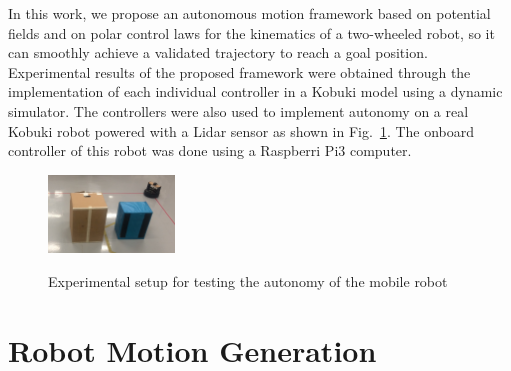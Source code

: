 \documentclass[conference]{IEEEtran}
\begin{document}
In this work, we propose an autonomous motion framework based on potential fields and on polar control laws for the kinematics of a two-wheeled robot, so it can smoothly achieve a validated trajectory to reach a goal position. Experimental results of the proposed framework were obtained through the implementation of each individual controller in a Kobuki model using a dynamic simulator. The controllers were also used to implement autonomy on a real Kobuki robot powered with a Lidar sensor as shown in Fig.~\ref{fig:example-robot}.  The onboard controller of this robot was done using a Raspberri Pi3 computer.

\begin{figure}%
  \centering \footnotesize
  \subfloat
  {\includegraphics[width=0.3\textwidth]{kobuki}}
  \captionsetup{font=footnotesize}
  \caption{Experimental setup for testing the autonomy of the mobile robot}
  \label{fig:example-robot}
\end{figure}


\section{Robot Motion Generation}
\label{sec:robot_motion}
\end{document}
